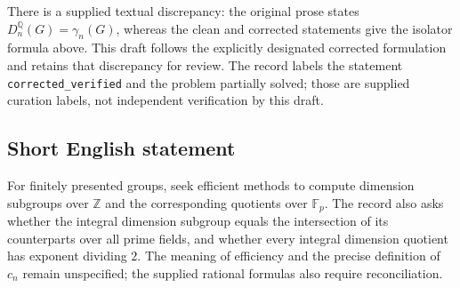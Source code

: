 \documentclass[11pt]{article}
\newcommand{\Z}{\mathbb{Z}}
\newcommand{\Q}{\mathbb{Q}}
\newcommand{\F}{\mathbb{F}}
\begin{document}
There is a supplied textual discrepancy: the original prose states \(D_n^{\Q}(G)=\gamma_n(G)\), whereas the clean and corrected statements give the isolator formula above. This draft follows the explicitly designated corrected formulation and retains that discrepancy for review. The record labels the statement \texttt{corrected\_verified} and the problem partially solved; those are supplied curation labels, not independent verification by this draft.
\subsection{Short English statement}
For finitely presented groups, seek efficient methods to compute dimension subgroups over \(\Z\) and the corresponding quotients over \(\F_p\). The record also asks whether the integral dimension subgroup equals the intersection of its counterparts over all prime fields, and whether every integral dimension quotient has exponent dividing \(2\). The meaning of efficiency and the precise definition of \(c_n\) remain unspecified; the supplied rational formulas also require reconciliation.
\end{document}
